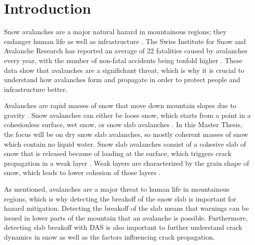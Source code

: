 \chapter{Introduction} \label{chap::intro}

    Snow avalanches are a major natural hazard in mountainous regions; they endanger human life as well as infrastructure \parencite{schweizerSnowAvalancheFormation2003}. The Swiss Institute for Snow and Avalanche Research has reported an average of 22 fatalities caused by avalanches every year, with the number of non-fatal accidents being tenfold higher \parencite{LongtermStatistics}. These data show that avalanches are a significhant threat, which is why it is crucial to understand how avalanches form and propagate in order to protect people and infrastructure better.

  Avalanches are rapid masses of snow that move down mountain slopes due to gravity \parencite{anceySnowAvalanches2001}. Snow avalanches can either be loose snow, which starts from a point in a cohesionless surface, wet snow, or snow slab avalanches \parencite{schweizerSnowAvalancheFormation2003}. In this Master Thesis, the focus will be on dry snow slab avalanches, so mostly coherent masses of snow which contain no liquid water. Snow slab avalanches consist of a cohesive slab of snow \parencite{schweizerSnowAvalancheFormation2003} that is released because of loading at the surface, which triggers crack propagation in a weak layer \parencite{gaumeSnowFractureRelation2017a}. Weak layers are characterized by the grain shape of snow, which leads to lower cohesion of those layers \parencite{fohnMechanicalStructuralProperties1998}. 


As mentioned, avalanches are a major threat to human life in mountainous regions, which is why detecting the breakoff of the snow slab is important for hazard mitigation. Detecting the breakoff of the slab means that warnings can be issued in lower parts of the mountain that an avalanche is possible. Furthermore, detecting slab breakoff with DAS is also important to further understand crack dynamics in snow as well as the factors influencing crack propagation. \par

  
